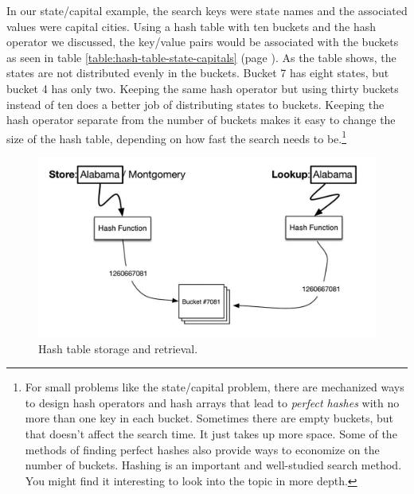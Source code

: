 In our state/capital example, the search keys were state names and the
associated values were capital cities.
Using a hash table with ten buckets and the hash operator
we discussed, the key/value pairs would be associated with the
buckets as seen in
table \ref{table:hash-table-state-capitals}
(page \pageref{table:hash-table-state-capitals}).
As the table shows, the states are not distributed evenly in the
buckets. Bucket 7 has
eight states, but bucket 4 has only two.
Keeping the same hash operator but using thirty buckets
instead of ten does a better job of distributing states to buckets.
Keeping the hash operator separate from the number of buckets
makes it easy to change the size of the
hash table, depending on how fast the search needs
to be.\footnote{For small problems like the state/capital problem,
there are mechanized ways to design hash operators and
hash arrays that lead to \emph{perfect hashes} with no
more than one key in each bucket. Sometimes there are
empty buckets, but that doesn't affect the search time.
It just takes up more space. Some of the methods of
finding perfect hashes also provide ways to economize
on the number of buckets.
Hashing is an important and well-studied search method.
You might find it interesting to look into the topic in more depth.}

\begin{figure}
\begin{center}
\includegraphics[scale=1]{images-cmyk/hash-table-process}
\end{center}
\caption{Hash table storage and retrieval.}
\label{fig:hash-table-process}
\end{figure}

